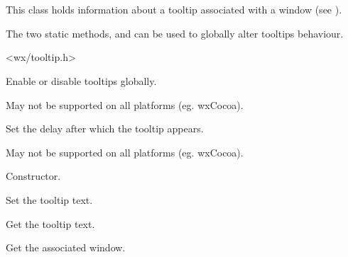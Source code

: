 \section{}\label{wxtooltip}

This class holds information about a tooltip associated with a window
(see ).

The two static methods,  and
 can be used to globally
alter tooltips behaviour.




<wx/tooltip.h>





\label{wxtooltipenable}


Enable or disable tooltips globally.

May not be supported on all platforms (eg. wxCocoa).


\label{wxtooltipsetdelay}


Set the delay after which the tooltip appears.

May not be supported on all platforms (eg. wxCocoa).

\label{wxtooltipwxtooltip}


Constructor.

\label{wxtooltipsettip}


Set the tooltip text.


\label{wxtooltipgettip}


Get the tooltip text.

\label{wxtooltipgetwindow}


Get the associated window.

